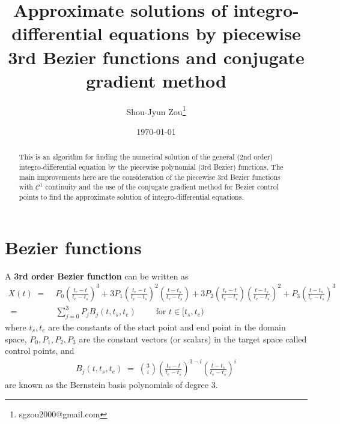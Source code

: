 \documentclass[12pt]{article}
\begin{document}
\title{\fontsize{18}{24} \bf Approximate solutions of integro-differential equations by piecewise 3rd Bezier functions and conjugate gradient method}
\author{\normalsize Shou-Jyun Zou\thanks{sgzou2000@gmail.com}}
\date{\small \today}


\maketitle


\begin{abstract}
	This is an algorithm for finding the numerical solution of the general (2nd order) integro-differential equation by the piecewise polynomial (3rd Bezier) functions.
	The main improvements here are the consideration of the piecewise 3rd Bezier functions with $\mathcal{C}^1$ continuity and the use of the conjugate gradient method for Bezier control points to find the approximate solution of integro-differential equations.
\end{abstract}


\tableofcontents





\section{Bezier functions}





A \textbf{3rd order Bezier function} can be written as
%
\begin{align*}
	X(t) \;=\; & P_{0} \left( \frac{t_{e}-t}{t_{e}-t_{s}} \right)^3 + 3 P_{1} \left( \frac{t_{e}-t}{t_{e}-t_{s}} \right)^2 \left( \frac{t-t_{s}}{t_{e}-t_{s}} \right) + 3 P_{2} \left( \frac{t_{e}-t}{t_{e}-t_{s}} \right) \left( \frac{t-t_{s}}{t_{e}-t_{s}} \right)^2 + P_{3} \left( \frac{t-t_{s}}{t_{e}-t_{s}} \right)^3 \\
	\;=\; & \sum_{j=0}^3 P_j B_j(t,t_{s},t_{e}) \qquad \textrm{ for $t\in [t_{s}, t_{e})$}
\end{align*}
%
where $t_{s},t_{e}$ are the constants of the start point and end point in the domain space, $P_0,P_1,P_2,P_3$ are the constant vectors (or scalars) in the target space called control points, and
%
\begin{align*}
	B_j(t,t_{s},t_{e}) \;=\; \binom{3}{i} \left( \frac{t_{e} - t}{t_{e} - t_{s}} \right)^{3-i} \left( \frac{t - t_{s}}{t_{e} - t_{s}} \right)^{i}
\end{align*}
%
are known as the Bernstein basis polynomials of degree $3$.
\end{document}
